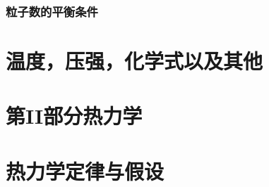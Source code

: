 \documentclass[UTF8]{ctexart}
\numberwithin{equation}{section}%
\numberwithin{figure}{section}%
\begin{document}
    \subsubsection{粒子数的平衡条件}







    \clearpage
    \section{温度，压强，化学式以及其他}\label{chap8}

    \clearpage
    \section*{第II部分\quad 热力学}
    \label{part2}
    \section{热力学定律与假设}\label{chap9}


    
\end{document}
